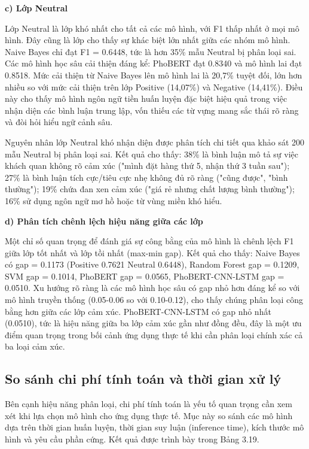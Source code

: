 \documentclass[14pt, a4paper]{report}
\begin{document}
\textbf{c) Lớp Neutral}


Lớp Neutral là lớp khó nhất cho tất cả các mô hình, với F1 thấp nhất ở mọi mô hình. Đây cũng là lớp cho thấy sự khác biệt lớn nhất giữa các nhóm mô hình. Naive Bayes chỉ đạt F1 = 0.6448, tức là hơn 35\% mẫu Neutral bị phân loại sai. Các mô hình học sâu cải thiện đáng kể: PhoBERT đạt 0.8340 và mô hình lai đạt 0.8518. Mức cải thiện từ Naive Bayes lên mô hình lai là 20,7\% tuyệt đối, lớn hơn nhiều so với mức cải thiện trên lớp Positive (14,07\%) và Negative (14,41\%). Điều này cho thấy mô hình ngôn ngữ tiền huấn luyện đặc biệt hiệu quả trong việc nhận diện các bình luận trung lập, vốn thiếu các từ vựng mang sắc thái rõ ràng và đòi hỏi hiểu ngữ cảnh sâu.


Nguyên nhân lớp Neutral khó nhận diện được phân tích chi tiết qua khảo sát 200 mẫu Neutral bị phân loại sai. Kết quả cho thấy: 38\% là bình luận mô tả sự việc khách quan không rõ cảm xúc ("mình đặt hàng thứ 5, nhận thứ 3 tuần sau"); 27\% là bình luận tích cực/tiêu cực nhẹ không đủ rõ ràng ("cũng được", "bình thường"); 19\% chứa đan xen cảm xúc ("giá rẻ nhưng chất lượng bình thường"); 16\% sử dụng ngôn ngữ mơ hồ hoặc từ vùng miền khó hiểu.


\textbf{d) Phân tích chênh lệch hiệu năng giữa các lớp}


Một chỉ số quan trọng để đánh giá sự công bằng của mô hình là chênh lệch F1 giữa lớp tốt nhất và lớp tồi nhất (max-min gap). Kết quả cho thấy: Naive Bayes có gap = 0.1173 (Positive 0.7621 \- Neutral 0.6448), Random Forest gap = 0.1209, SVM gap = 0.1014, PhoBERT gap = 0.0565, PhoBERT-CNN-LSTM gap = 0.0510. Xu hướng rõ ràng là các mô hình học sâu có gap nhỏ hơn đáng kể so với mô hình truyền thống (0.05-0.06 so với 0.10-0.12), cho thấy chúng phân loại công bằng hơn giữa các lớp cảm xúc. PhoBERT-CNN-LSTM có gap nhỏ nhất (0.0510), tức là hiệu năng giữa ba lớp cảm xúc gần như đồng đều, đây là một ưu điểm quan trọng trong bối cảnh ứng dụng thực tế khi cần phân loại chính xác cả ba loại cảm xúc.


\subsection{So sánh chi phí tính toán và thời gian xử lý}


Bên cạnh hiệu năng phân loại, chi phí tính toán là yếu tố quan trọng cần xem xét khi lựa chọn mô hình cho ứng dụng thực tế. Mục này so sánh các mô hình dựa trên thời gian huấn luyện, thời gian suy luận (inference time), kích thước mô hình và yêu cầu phần cứng. Kết quả được trình bày trong Bảng 3.19.
\end{document}
